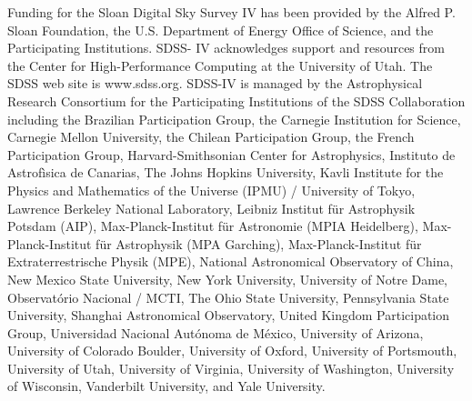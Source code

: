 \documentclass[longauth]{aa} %
\begin{document}
\begin{acknowledgements}
        Funding for the Sloan Digital Sky Survey IV has been provided by the Alfred P. Sloan Foundation, the U.S. Department of Energy Office of Science, and the Participating Institutions. SDSS- IV acknowledges support and resources from the Center for High-Performance Computing at the University of Utah. The SDSS web site is www.sdss.org. SDSS-IV is managed by the Astrophysical Research Consortium for the Participating Institutions of the SDSS Collaboration including the Brazilian Participation Group, the Carnegie Institution for Science, Carnegie Mellon University, the Chilean Participation Group, the French Participation Group, Harvard-Smithsonian Center for Astrophysics, Instituto de Astrof\`{i}sica de Canarias, The Johns Hopkins University, Kavli Institute for the Physics and Mathematics of the Universe (IPMU) / University of Tokyo, Lawrence Berkeley National Laboratory, Leibniz Institut f\"{u}r Astrophysik Potsdam (AIP), Max-Planck-Institut f\"{u}r Astronomie (MPIA Heidelberg), Max-Planck-Institut f\"{u}r Astrophysik (MPA Garching), Max-Planck-Institut f\"{u}r Extraterrestrische Physik (MPE), National Astronomical Observatory of China, New Mexico State University, New York University, University of Notre Dame, Observat\'{o}rio Nacional / MCTI, The Ohio State University, Pennsylvania State University, Shanghai Astronomical Observatory, United Kingdom Participation Group, Universidad Nacional Aut\'{o}noma de M\'{e}xico, University of Arizona, University of Colorado Boulder, University of Oxford, University of Portsmouth, University of Utah, University of Virginia, University of Washington, University of Wisconsin, Vanderbilt University, and Yale University.\\
	\end{acknowledgements}
	
	
%	
%	
\end{document}
